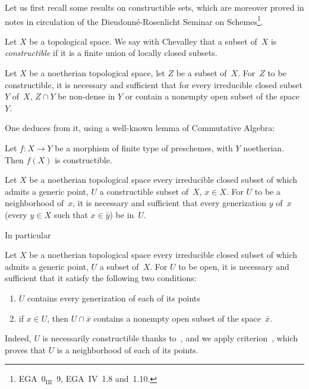 Let us first recall some results on constructible sets,
which are moreover proved in notes
in circulation of the Dieudonn\'e-Rosenlicht Seminar on
Schemes\footnote{\Cf EGA~0$_\mathrm{III}$~9, EGA~IV~1.8 and~1.10.}.

Let $X$ be a topological space. We say with Chevalley that a subset
of~$X$ is \emph{constructible}
if it is a finite union of locally closed subsets.

\begin{lemma}
\label{IV.6.1}
Let $X$ be a noetherian topological space, let $Z$ be a subset
of~$X$. For~$Z$ to be constructible, it is necessary and sufficient that
for every irreducible closed subset $Y$ of~$X$, $Z\cap Y$
be non-dense in $Y$ or contain a nonempty open subset of
the space~$Y$.
\end{lemma}

One deduces from it, using a well-known lemma of Commutative
Algebra:

\begin{lemma}[Chevalley]
\label{IV.6.2}
Let $f\colon X\to Y$ be a morphism of finite type of
preschemes, with $Y$ noetherian. Then $f(X)$ is
constructible.
\end{lemma}

\begin{lemma}
\label{IV.6.3}
Let $X$ be a noetherian topological space every irreducible closed
subset of which admits a generic point, $U$ a
constructible subset of~$X$, $x\in X$. For $U$ to be a neighborhood
of~$x$, it is necessary and sufficient that every generization $y$ of~$x$
(\ie every $y\in X$ such that $x\in \bar{y}$) be in~$U$.
\end{lemma}

In particular

\begin{corollary}
\label{IV.6.4}
Let $X$ be a noetherian topological space every irreducible closed
subset of which admits a generic point, $U$ a
subset of~$X$. For $U$ to be open, it is necessary and sufficient
that it satisfy the following two conditions:
%
\begin{enumerate}
\item[(a)] $U$ contains every generization of each of its
points
\item[(b)] if $x\in U$, then
$U\cap\bar{x}$ contains a nonempty open subset of
the space~$\bar{x}$.
\end{enumerate}
\end{corollary}

Indeed, $U$ is necessarily constructible thanks
to~, and we apply criterion~, which
proves that $U$ is a neighborhood of each of its points.

